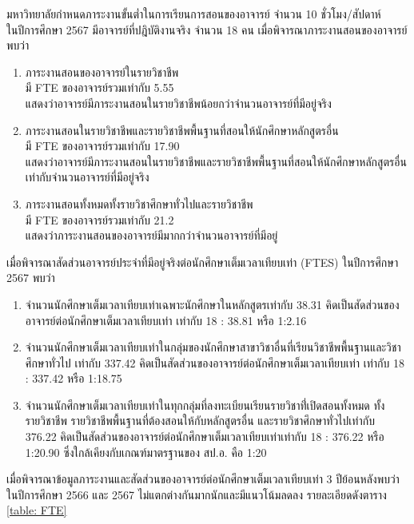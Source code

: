 \begin{doclist}
\end{doclist}
มหาวิทยาลัยกำหนดภาระงานขั้นต่ำในการเรียนการสอนของอาจารย์ จำนวน 10 ชั่วโมง/สัปดาห์\\
ในปีการศึกษา 2567 มีอาจารย์ที่ปฎิบัติงานจริง จำนวน 18 คน เมื่อพิจารณาภาระงานสอนของอาจารย์ พบว่า
\begin{enumerate}[label=$\bullet$]
	\item ภาระงานสอนของอาจารย์ในรายวิชาชีพ\\
	 มี FTE ของอาจารย์รวมเท่ากับ 5.55\\ แสดงว่าอาจารย์มีภาระงานสอนในรายวิชาชีพน้อยกว่าจำนวนอาจารย์ที่มีอยู่จริง
	 \item ภาระงานสอนในรายวิชาชีพและรายวิชาชีพพื้นฐานที่สอนให้นักศึกษาหลักสูตรอื่น\\ มี FTE ของอาจารย์รวมเท่ากับ 17.90 \\แสดงว่าอาจารย์มีภาระงานสอนในรายวิชาชีพและรายวิชาชีพพื้นฐานที่สอนให้นักศึกษาหลักสูตรอื่นเท่ากับจำนวนอาจารย์ที่มีอยู่จริง
	 \item ภาระงานสอนทั้งหมดทั้งรายวิชาศึกษาทั่วไปและรายวิชาชีพ\\
	 มี FTE ของอาจารย์รวมเท่ากับ 21.2 \\แสดงว่าภาระงานสอนของอาจารย์มีมากกว่าจำนวนอาจารย์ที่มีอยู่
\end{enumerate}

 
เมื่อพิจารณาสัดส่วนอาจารย์ประจำที่มีอยู่จริงต่อนักศึกษาเต็มเวลาเทียบเท่า (FTES) ในปีการศึกษา 2567 พบว่า
\begin{enumerate}[label=$\bullet$]
	\item จำนวนนักศึกษาเต็มเวลาเทียบเท่าเฉพาะนักศึกษาในหลักสูตรเท่ากับ 38.31 คิดเป็นสัดส่วนของอาจารย์ต่อนักศึกษาเต็มเวลาเทียบเท่า เท่ากับ 18 : 38.81 หรือ 1:2.16
	\item จำนวนนักศึกษาเต็มเวลาเทียบเท่าในกลุ่มของนักศึกษาสาขาวิชาอื่นที่เรียนวิชาชีพพื้นฐานและวิชาศึกษาทั่วไป เท่ากับ 337.42 คิดเป็นสัดส่วนของอาจารย์ต่อนักศึกษาเต็มเวลาเทียบเท่า เท่ากับ 18 : 337.42 หรือ 1:18.75
	\item จำนวนนักศึกษาเต็มเวลาเทียบเท่าในทุกกลุ่มที่ลงทะเบียนเรียนรายวิชาที่่เปิดสอนทั้งหมด ทั้งรายวิชาชีพ  รายวิชาชีพพื้นฐานที่ต้องสอนให้กับหลักสูตรอื่น และรายวิชาศึกษาทั่วไปเท่ากับ 376.22 คิดเป็นสัดส่วนของอาจารย์ต่อนักศึกษาเต็มเวลาเทียบเท่าเท่ากับ 18 : 376.22 หรือ 1:20.90 ซึ่งใกล้เคียงกับเกณฑ์มาตรฐานของ สป.อ. คือ 1:20
\end{enumerate}
เมื่อพิจารณาข้อมูลภาระงานและสัดส่วนของอาจารย์ต่อนักศึกษาเต็มเวลาเทียบเท่า 3 ปีย้อนหลังพบว่าในปีการศึกษา 2566 และ 2567
ไม่แตกต่างกันมากนักและมีแนวโน้มลดลง รายละเอียดดังตาราง \ref{table: FTE}

